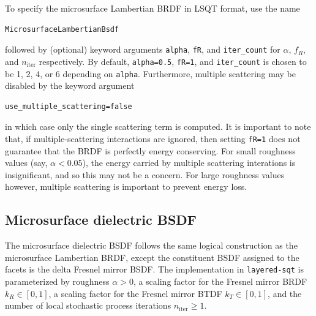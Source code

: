 \documentclass[
    twoside,
    twocolumn,
    letterpaper,
    10pt]{article}
\begin{document}
To specify the microsurface Lambertian BRDF in LSQT format, use the 
name 
\begin{verbatim}
MicrosurfaceLambertianBsdf
\end{verbatim}
followed by (optional) keyword arguments 
\texttt{alpha}, \texttt{fR}, and \texttt{iter\_count} for $\alpha$,
$f_R$, and $n_{\text{iter}}$ respectively. By default, \texttt{alpha=0.5},
\texttt{fR=1}, and \texttt{iter\_count} is chosen to be 1, 2, 4, or 6 
depending on \texttt{alpha}. Furthermore, multiple scattering may be 
disabled by the keyword argument
\begin{verbatim}
use_multiple_scattering=false
\end{verbatim}
in which case only the single scattering term is computed. It is 
important to note that, if multiple-scattering interactions are 
ignored, then setting \texttt{fR=1} does not guarantee that the BRDF 
is perfectly energy conserving. 
For small roughness values (say, $\alpha < 0.05$), the energy carried by 
multiple scattering interations is insignificant, and so this may not be a
concern. For large roughness values however, multiple scattering is important
to prevent energy loss.

\subsection{Microsurface dielectric BSDF}

The microsurface dielectric BSDF follows the same logical construction as 
the microsurface Lambertian BRDF, except the constituent BSDF assigned to the
facets is the delta Fresnel mirror BSDF. The implementation in 
\texttt{layered-sqt} is parameterized by roughness $\alpha > 0$, a scaling
factor for the Fresnel mirror BRDF $k_R \in [0, 1]$, a scaling factor for 
the Fresnel mirror BTDF $k_T \in [0, 1]$, and the number of local stochastic 
process iterations $n_{\text{iter}} \ge 1$.
\end{document}
